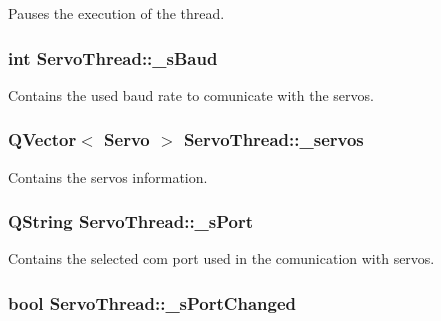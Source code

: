 Pauses the execution of the thread. 

\hypertarget{a00007_a5b9a41b9e271275b914affb0a845a2ee}{}
\subsubsection[{\+\_\+s\+Baud}]{\setlength{\rightskip}{0pt plus 5cm}int Servo\+Thread\+::\+\_\+s\+Baud\hspace{0.3cm}{\ttfamily [private]}}\label{a00007_a5b9a41b9e271275b914affb0a845a2ee}


Contains the used baud rate to comunicate with the servos. 

\hypertarget{a00007_a1ac6662fe6d198b5971ae0ffa7ddfcfd}{}
\subsubsection[{\+\_\+servos}]{\setlength{\rightskip}{0pt plus 5cm}Q\+Vector$<$ {\bf Servo} $>$ Servo\+Thread\+::\+\_\+servos\hspace{0.3cm}{\ttfamily [private]}}\label{a00007_a1ac6662fe6d198b5971ae0ffa7ddfcfd}


Contains the servos information. 

\hypertarget{a00007_ac9a614aa1518efb49b0a06636bd1bdbf}{}
\subsubsection[{\+\_\+s\+Port}]{\setlength{\rightskip}{0pt plus 5cm}Q\+String Servo\+Thread\+::\+\_\+s\+Port\hspace{0.3cm}{\ttfamily [private]}}\label{a00007_ac9a614aa1518efb49b0a06636bd1bdbf}


Contains the selected com port used in the comunication with servos. 

\hypertarget{a00007_a6e803432db01b10ed975132315280fd3}{}
\subsubsection[{\+\_\+s\+Port\+Changed}]{\setlength{\rightskip}{0pt plus 5cm}bool Servo\+Thread\+::\+\_\+s\+Port\+Changed\hspace{0.3cm}{\ttfamily [private]}}\label{a00007_a6e803432db01b10ed975132315280fd3}


